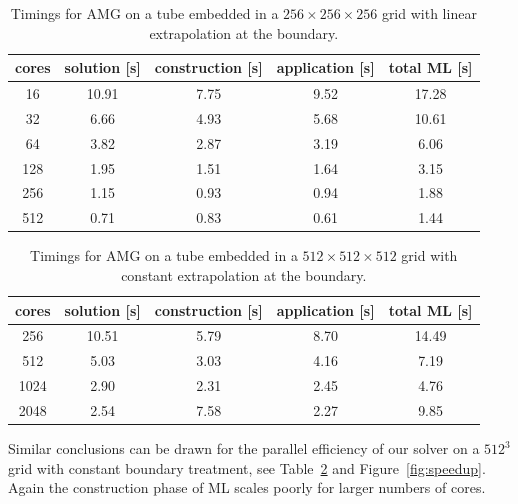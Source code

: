\documentclass[a4paper,10pt,3p,final,pdftex]{elsarticle}
\begin{document}
\begin{table}[htb]
  \begin{center}
    \begin{tabular}{ccccc}
      \hline
      cores & solution [s] & construction [s] & application [s] & total ML [s] \\
      \hline
      16  & 10.91 &  7.75 &  9.52 & 17.28 \\
      32  &  6.66 &  4.93 &  5.68 & 10.61 \\
      64  &  3.82 &  2.87 &  3.19 &  6.06 \\
      128 &  1.95 &  1.51 &  1.64 &  3.15 \\
      256 &  1.15 &  0.93 &  0.94 &  1.88 \\
      512 &  0.71 &  0.83 &  0.61 &  1.44 \\
      \hline
    \end{tabular}
    \caption{Timings for AMG on a tube embedded in a $256\times256\times256$
      grid with linear extrapolation at the boundary.}
    \label{tbl:timings_solver_256}
    \end{center}
\end{table}


\begin{table}[htb]
  \begin{center}
    \begin{tabular}{ccccc}
      \hline
      cores & solution [s] & construction [s] & application [s] & total ML [s] \\
      \hline
      256  &  10.51 &  5.79 &  8.70 &  14.49 \\
      512  &  5.03 &  3.03 &  4.16 &  7.19 \\
      1024 &  2.90 &  2.31 &  2.45 &  4.76 \\
      2048 &  2.54 &  7.58 &  2.27 &  9.85 \\
      \hline
    \end{tabular}
    \caption{Timings for AMG on a tube embedded in a $512\times512\times512$
      grid with constant extrapolation at the boundary.}
    \label{tbl:timings_solver_512} 
  \end{center}
\end{table}

Similar conclusions can be drawn for the parallel efficiency of our
solver on a $512^3$ grid with constant boundary treatment, see
Table~\ref{tbl:timings_solver_512} and Figure~\ref{fig:speedup}.  Again the
construction phase of ML scales poorly for larger numbers of cores.
\end{document}
